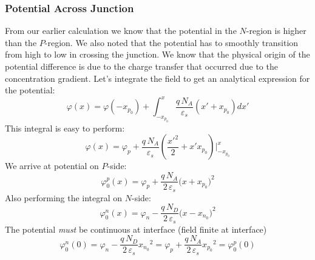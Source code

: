 \subsubsection{Potential Across Junction}
From our earlier calculation we know that the potential in the $N$-region is higher than the  $P$-region.  We also noted that the potential has to smoothly transition from high to low in crossing the junction.   We know that the physical origin of the potential difference is due to the charge transfer that occurred due to the concentration gradient.   Let's integrate the field to get an analytical expression for the potential:
    \begin{equation}
        \varphi(x) = \varphi(-x_{p_0}) + \int_{-x_{p_0}}^{x} \frac{q\,N_A}{\varepsilon_s}(x' + x_{p_0})dx' 
    \end{equation}
This integral is easy to perform:
    \begin{equation}
        \varphi(x) = \varphi_p + \frac{q\,N_A}{\varepsilon_s}
                    \left( {\frac{{x{'^2}}}{2} + x'x_{p_0}} \right)
                    \big\vert_{-x_{p_0}}^x 
    \end{equation}
We arrive at potential on $P$-side:
    \begin{equation}
        \varphi_0^p(x) = \varphi_p + \frac{q\,N_A}{2\,\varepsilon_s}{(x + {x_{p_0})}^2} 
    \end{equation}
Also performing the integral on $N$-side:
    \begin{equation}
        \varphi_0^n(x) = \varphi_n - \frac{q\,N_D}{2\,\varepsilon_s}{(x - {x_{n_0})}^2} 
    \end{equation}
The potential \textit{must} be continuous at interface (field finite at interface)
    \begin{equation}
        \varphi_0^n(0) = \varphi_n - \frac{q\,N_D}{2\,\varepsilon_s}{{x_{n_0}}^2} 
                        = \varphi_p + \frac{q\,N_A}{2\,\varepsilon_s}{{x_{p_0}}^2} = \varphi_0^p(0)
    \end{equation}
